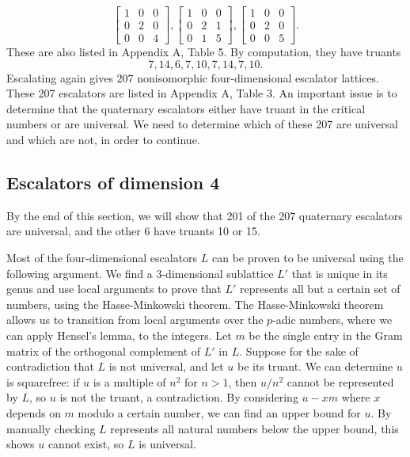 \documentclass[letterpaper, 12pt]{article}
\begin{document}
\[\begin{bmatrix} 1 & 0 & 0 \\ 0 & 2 & 0 \\ 0 & 0 & 4 \end{bmatrix}, \begin{bmatrix} 1 & 0 & 0 \\ 0 & 2 & 1 \\ 0 & 1 & 5 \end{bmatrix}, \begin{bmatrix} 1 & 0 & 0 \\ 0 & 2 & 0 \\ 0 & 0 & 5 \end{bmatrix}.\]
These are also listed in Appendix A, Table 5.
By computation, they have truants
\[7, 14, 6, 7, 10, 7, 14, 7, 10.\]
Escalating again gives $207$ nonisomorphic four-dimensional escalator lattices. These 207 escalators are listed in Appendix A, Table 3. An important issue is to determine that the quaternary escalators either have truant in the critical numbers or are universal. We need to determine which of these 207 are universal and which are not, in order to continue.

\subsection{Escalators of dimension 4}
By the end of this section, we will show that 201 of the 207 quaternary escalators are universal, and the other 6 have truants 10 or 15.

Most of the four-dimensional escalators $L$ can be proven to be universal using the following argument.
We find a $3$-dimensional sublattice $L'$ that is unique in its genus and use local arguments to prove that $L'$ represents all but a certain set of numbers, using the Hasse-Minkowski theorem. The Hasse-Minkowski theorem allows us to transition from local arguments over the $p$-adic numbers, where we can apply Hensel's lemma, to the integers.
Let $m$ be the single entry in the Gram matrix of the orthogonal complement of $L'$ in $L$.
Suppose for the sake of contradiction that $L$ is not universal, and let $u$ be its truant.
We can determine $u$ is squarefree: if $u$ is a multiple of $n^2$ for $n > 1$, then $u/n^2$ cannot be represented by $L$, so $u$ is not the truant, a contradiction. By considering $u - xm$ where $x$ depends on $m$ modulo a certain number, we can find an upper bound for $u$.
By manually checking $L$ represents all natural numbers below the upper bound, this shows $u$ cannot exist, so $L$ is universal.
\end{document}

